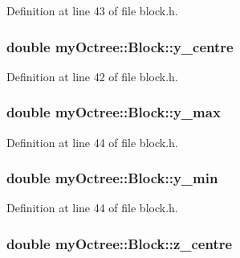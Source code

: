 Definition at line 43 of file block.\+h.

\hypertarget{classmy_octree_1_1_block_a1bddbdf912bda6409ed258be0fccde22}{}
\subsubsection[{y\+\_\+centre}]{\setlength{\rightskip}{0pt plus 5cm}double my\+Octree\+::\+Block\+::y\+\_\+centre}\label{classmy_octree_1_1_block_a1bddbdf912bda6409ed258be0fccde22}


Definition at line 42 of file block.\+h.

\hypertarget{classmy_octree_1_1_block_a1e3c4b1935a5652e29c8b874c8075145}{}
\subsubsection[{y\+\_\+max}]{\setlength{\rightskip}{0pt plus 5cm}double my\+Octree\+::\+Block\+::y\+\_\+max}\label{classmy_octree_1_1_block_a1e3c4b1935a5652e29c8b874c8075145}


Definition at line 44 of file block.\+h.

\hypertarget{classmy_octree_1_1_block_ad06319c48ab631b16b7b4b678d7c5d0e}{}
\subsubsection[{y\+\_\+min}]{\setlength{\rightskip}{0pt plus 5cm}double my\+Octree\+::\+Block\+::y\+\_\+min}\label{classmy_octree_1_1_block_ad06319c48ab631b16b7b4b678d7c5d0e}


Definition at line 44 of file block.\+h.

\hypertarget{classmy_octree_1_1_block_a02aab304587fe213b1dd3d0a10e7ea82}{}
\subsubsection[{z\+\_\+centre}]{\setlength{\rightskip}{0pt plus 5cm}double my\+Octree\+::\+Block\+::z\+\_\+centre}\label{classmy_octree_1_1_block_a02aab304587fe213b1dd3d0a10e7ea82}


